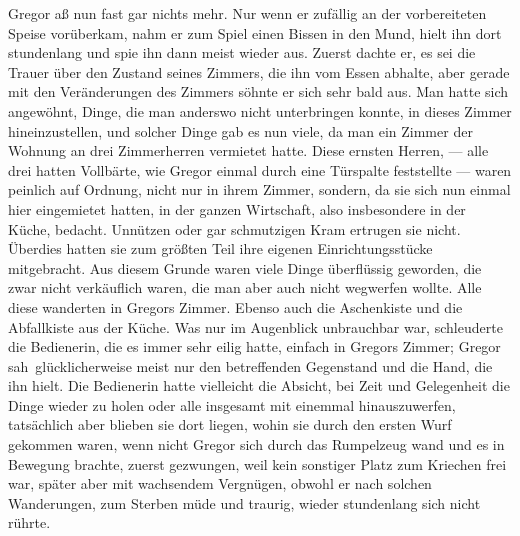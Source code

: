 Gregor aß nun fast gar nichts mehr. Nur wenn er zufällig an der
vorbereiteten Speise vorüberkam, nahm er zum Spiel einen Bissen in den
Mund, hielt ihn dort stundenlang und spie ihn dann meist wieder aus.
Zuerst dachte er, es sei die Trauer über den Zustand seines Zimmers, die
ihn vom Essen abhalte, aber gerade mit den Veränderungen des Zimmers
söhnte er sich sehr bald aus. Man hatte sich angewöhnt, Dinge, die man
anderswo nicht unterbringen konnte, in dieses Zimmer hineinzustellen,
und solcher Dinge gab es nun viele, da man ein Zimmer der Wohnung an
drei Zimmerherren vermietet hatte. Diese ernsten Herren, --- alle drei
hatten Vollbärte, wie Gregor einmal durch eine Türspalte feststellte ---
waren peinlich auf Ordnung, nicht nur in ihrem Zimmer, sondern, da sie
sich nun einmal hier eingemietet hatten, in der ganzen Wirtschaft, also
insbesondere in der Küche, bedacht. Unnützen oder gar schmutzigen Kram
ertrugen sie nicht. Überdies hatten sie zum größten Teil ihre eigenen
Einrichtungsstücke mitgebracht. Aus diesem Grunde waren viele Dinge
überflüssig geworden, die zwar nicht verkäuflich waren, die man aber
auch nicht wegwerfen wollte. Alle diese wanderten in Gregors Zimmer.
Ebenso auch die Aschenkiste und die Abfallkiste aus der Küche. Was nur
im Augenblick unbrauchbar war, schleuderte die Bedienerin, die es immer
sehr eilig hatte, einfach in Gregors Zimmer; Gregor sah\est\ glücklicherweise
meist nur den betreffenden Gegenstand und die Hand, die ihn hielt. Die
Bedienerin hatte vielleicht die Absicht, bei Zeit und Gelegenheit die
Dinge wieder zu holen oder alle insgesamt mit einemmal hinauszuwerfen,
tatsächlich aber blieben sie dort liegen, wohin sie durch den ersten
Wurf gekommen waren, wenn nicht Gregor sich durch das Rumpelzeug wand
und es in Bewegung brachte, zuerst gezwungen, weil kein sonstiger Platz
zum Kriechen frei war, später aber mit wachsendem Vergnügen, obwohl er
nach solchen Wanderungen, zum Sterben müde und traurig, wieder
stundenlang sich nicht rührte.

